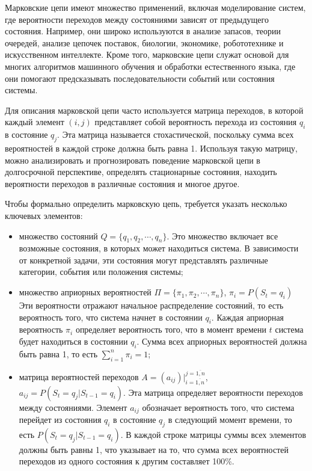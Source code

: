 Марковские цепи имеют множество применений, включая моделирование систем, где вероятности переходов между состояниями зависят от предыдущего состояния. Например, они широко используются в анализе запасов, теории очередей, анализе цепочек поставок, биологии, экономике, робототехнике и искусственном интеллекте. Кроме того, марковские цепи служат основой для многих алгоритмов машинного обучения и обработки естественного языка, где они помогают предсказывать последовательности событий или состояния системы.

Для описания марковской цепи часто используется матрица переходов, в которой каждый элемент $(i, j)$ представляет собой вероятность перехода из состояния $q_i$ в состояние $q_j$. Эта матрица называется стохастической, поскольку сумма всех вероятностей в каждой строке должна быть равна 1. Используя такую матрицу, можно анализировать и прогнозировать поведение марковской цепи в долгосрочной перспективе, определять стационарные состояния, находить вероятности переходов в различные состояния и многое другое.

Чтобы формально определить марковскую цепь, требуется указать несколько ключевых элементов:

\begin{itemize}
	\item множество состояний $Q = \{q_1, q_2, \cdots, q_n\}$. Это множество включает все возможные состояния, в которых может находиться система. В зависимости от конкретной задачи, эти состояния могут представлять различные категории, события или положения системы;
	\item множество априорных вероятностей $\Pi = \{ \pi_1, \pi_2, \cdots, \pi_n \}$, $\pi_i = P(S_t = q_{i})$ Эти вероятности отражают начальное распределение состояний, то есть вероятность того, что система начнет в состоянии $q_i$. Каждая априорная вероятность $\pi_i$ определяет вероятность того, что в момент времени $t$ система будет находиться в состоянии $q_i$. Сумма всех априорных вероятностей должна быть равна 1, то есть $\sum\limits_{i=1}^{n} \pi_i = 1$;
	\item матрица вероятностей переходов $A = \left(a_{ij}\right)|_{i=\overline{1,n}}^{j=\overline{1,n}}$, $a_{ij} = P(S_t = q_j | S_{t-1} = q_i)$. Эта матрица определяет вероятности переходов между состояниями. Элемент $a_{ij}$ обозначает вероятность того, что система перейдет из состояния $q_i$ в состояние $q_j$ в следующий момент времени, то есть $P(S_t = q_j | S_{t-1} = q_i)$. В каждой строке матрицы суммы всех элементов должны быть равны 1, что указывает на то, что сумма всех вероятностей переходов из одного состояния к другим составляет 100\%.
\end{itemize}

